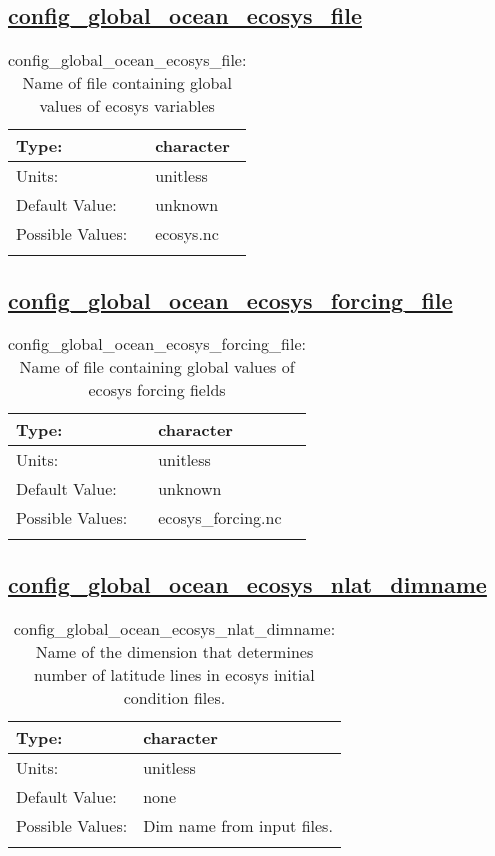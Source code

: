 \subsection[config\_global\_ocean\_ecosys\_file]{\hyperref[sec:nm_tab_global_ocean]{config\_global\_ocean\_ecosys\_file}}
\label{subsec:nm_sec_config_global_ocean_ecosys_file}
\begin{center}
\begin{longtable}{| p{2.0in} || p{4.0in} |}
    \hline
    Type: & character \\
    \hline
    Units: & \si{unitless} \\
    \hline
    Default Value: & unknown \\
    \hline
    Possible Values: & ecosys.nc \\
    \hline
    \caption{config\_global\_ocean\_ecosys\_file: Name of file containing global values of ecosys variables}
\end{longtable}
\end{center}
\subsection[config\_global\_ocean\_ecosys\_forcing\_file]{\hyperref[sec:nm_tab_global_ocean]{config\_global\_ocean\_ecosys\_forcing\_file}}
\label{subsec:nm_sec_config_global_ocean_ecosys_forcing_file}
\begin{center}
\begin{longtable}{| p{2.0in} || p{4.0in} |}
    \hline
    Type: & character \\
    \hline
    Units: & \si{unitless} \\
    \hline
    Default Value: & unknown \\
    \hline
    Possible Values: & ecosys\_forcing.nc \\
    \hline
    \caption{config\_global\_ocean\_ecosys\_forcing\_file: Name of file containing global values of ecosys forcing fields}
\end{longtable}
\end{center}
\subsection[config\_global\_ocean\_ecosys\_nlat\_dimname]{\hyperref[sec:nm_tab_global_ocean]{config\_global\_ocean\_ecosys\_nlat\_dimname}}
\label{subsec:nm_sec_config_global_ocean_ecosys_nlat_dimname}
\begin{center}
\begin{longtable}{| p{2.0in} || p{4.0in} |}
    \hline
    Type: & character \\
    \hline
    Units: & \si{unitless} \\
    \hline
    Default Value: & none \\
    \hline
    Possible Values: & Dim name from input files. \\
    \hline
    \caption{config\_global\_ocean\_ecosys\_nlat\_dimname: Name of the dimension that determines number of latitude lines in ecosys initial condition files.}
\end{longtable}
\end{center}
